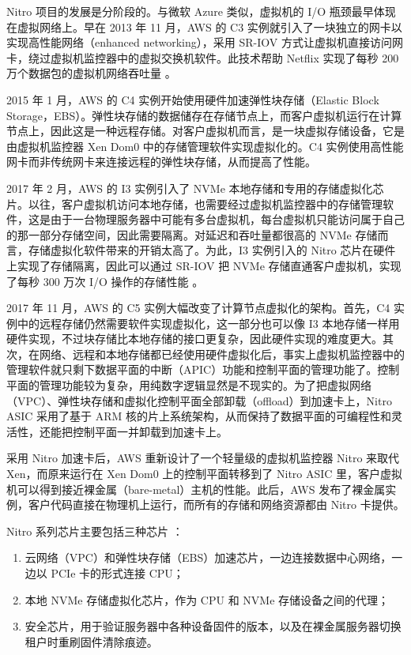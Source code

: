 Nitro 项目的发展是分阶段的。与微软 Azure 类似，虚拟机的 I/O 瓶颈最早体现在虚拟网络上。早在 2013 年 11 月，AWS 的 C3 实例就引入了一块独立的网卡以实现高性能网络（enhanced networking），采用 SR-IOV 方式让虚拟机直接访问网卡，绕过虚拟机监控器中的虚拟交换机软件。此技术帮助 Netflix 实现了每秒 200 万个数据包的虚拟机网络吞吐量 \cite{netflix-aws}。

2015 年 1 月，AWS 的 C4 实例开始使用硬件加速弹性块存储（Elastic Block Storage，EBS）。弹性块存储的数据储存在存储节点上，而客户虚拟机运行在计算节点上，因此这是一种远程存储。对客户虚拟机而言，是一块虚拟存储设备，它是由虚拟机监控器 Xen Dom0 中的存储管理软件实现虚拟化的。C4 实例使用高性能网卡而非传统网卡来连接远程的弹性块存储，从而提高了性能。

2017 年 2 月，AWS 的 I3 实例引入了 NVMe 本地存储和专用的存储虚拟化芯片。以往，客户虚拟机访问本地存储，也需要经过虚拟机监控器中的存储管理软件，这是由于一台物理服务器中可能有多台虚拟机，每台虚拟机只能访问属于自己的那一部分存储空间，因此需要隔离。对延迟和吞吐量都很高的 NVMe 存储而言，存储虚拟化软件带来的开销太高了。为此，I3 实例引入的 Nitro 芯片在硬件上实现了存储隔离，因此可以通过 SR-IOV 把 NVMe 存储直通客户虚拟机，实现了每秒 300 万次 I/O 操作的存储性能 \cite{aws-local-storage}。

2017 年 11 月，AWS 的 C5 实例大幅改变了计算节点虚拟化的架构。首先，C4 实例中的远程存储仍然需要软件实现虚拟化，这一部分也可以像 I3 本地存储一样用硬件实现，不过块存储比本地存储的接口更复杂，因此硬件实现的难度更大。其次，在网络、远程和本地存储都已经使用硬件虚拟化后，事实上虚拟机监控器中的管理软件就只剩下数据平面的中断（APIC）功能和控制平面的管理功能了。控制平面的管理功能较为复杂，用纯数字逻辑显然是不现实的。为了把虚拟网络（VPC）、弹性块存储和虚拟化控制平面全部卸载（offload）到加速卡上，Nitro ASIC 采用了基于 ARM 核的片上系统架构，从而保持了数据平面的可编程性和灵活性，还能把控制平面一并卸载到加速卡上。

采用 Nitro 加速卡后，AWS 重新设计了一个轻量级的虚拟机监控器 Nitro 来取代 Xen，而原来运行在 Xen Dom0 上的控制平面转移到了 Nitro ASIC 里，客户虚拟机可以得到接近裸金属（bare-metal）主机的性能。此后，AWS 发布了裸金属实例，客户代码直接在物理机上运行，而所有的存储和网络资源都由 Nitro 卡提供。

Nitro 系列芯片主要包括三种芯片 \cite{nitro-blog,nitro-talk,nitro-web}：
\begin{enumerate}
	\item 云网络（VPC）和弹性块存储（EBS）加速芯片，一边连接数据中心网络，一边以 PCIe 卡的形式连接 CPU；
	\item 本地 NVMe 存储虚拟化芯片，作为 CPU 和 NVMe 存储设备之间的代理；
	\item 安全芯片，用于验证服务器中各种设备固件的版本，以及在裸金属服务器切换租户时重刷固件清除痕迹。
\end{enumerate}

